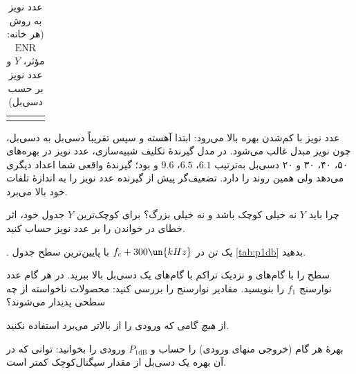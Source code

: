 \documentclass[a4paper,11pt]{article}
\begin{document}
\begin{table}[H]
	\centering\small
	\caption{عدد نویز به روش  (هر خانه: $\mathrm{ENR}$ مؤثر، $Y$ و عدد نویز بر حسب دسی‌بل)}
	\label{tab:nf}
	\begin{tabularx}{\linewidth}{|X|Y|Y|Y|}
		\hline
		\hdrrow {} &  &  &  \\ \hline
		 & \rowstrut & & \\ \hline
		
	\end{tabularx}
\end{table}

\begin{expectbox}
عدد نویز با کم‌شدن بهره بالا می‌رود: ابتدا آهسته و سپس تقریباً دسی‌بل به دسی‌بل، چون نویز مبدل غالب می‌شود. در مدل گیرندهٔ تکلیف شبیه‌سازی، عدد نویز در بهره‌های ۵۰، ۴۰، ۳۰ و ۲۰ دسی‌بل به‌ترتیب
$6.1$،
$6.5$،
$9.6$
و
بود؛ گیرندهٔ واقعی شما اعداد دیگری می‌دهد ولی همین روند را دارد. تضعیف‌گر پیش از گیرنده عدد نویز را به اندازهٔ تلفات خود بالا می‌برد.
\end{expectbox}

\begin{question}
چرا باید
$Y$
نه خیلی کوچک باشد و نه خیلی بزرگ؟ برای کوچک‌ترین
$Y$
جدول خود، اثر خطای
در خواندن را بر عدد نویز حساب کنید.
\end{question}

\label{part:p1db}
\begin{steps}
\item {}.
یک تن در
$f_c + 300\un{kHz}$
با پایین‌ترین سطح جدول
\ref{tab:p1db}
بدهید.
\item سطح را با گام‌های
و نزدیک تراکم با گام‌های یک دسی‌بل بالا ببرید. در هر گام عدد نوارسنج
$f_1$
را بنویسید. مقادیر نوارسنج را بررسی کنید: محصولات ناخواسته از چه سطحی پدیدار می‌شوند؟
\item از \emph{هیچ} گامی که ورودی را از
بالاتر می‌برد استفاده نکنید.

\item بهرهٔ هر گام (خروجی منهای ورودی) را حساب و
$P_{\mathrm{1dB}}$
ورودی را بخوانید: توانی که در آن بهره یک دسی‌بل از مقدار سیگنال‌کوچک کمتر است.
\end{steps}
\end{document}
